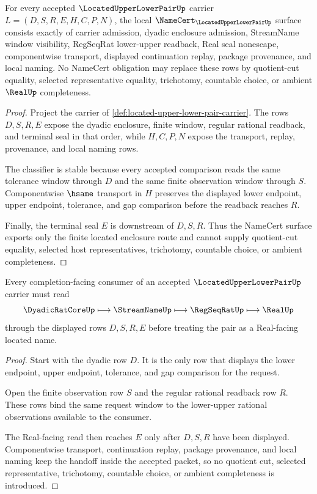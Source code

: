 \begin{theorem}
\label{thm:located-upper-lower-pair-namecert-obligations}
For every accepted $\LocatedUpperLowerPairUp$ carrier $L=(D,S,R,E,H,C,P,N)$, the local $\NameCert_{\LocatedUpperLowerPairUp}$ surface consists exactly of carrier admission, dyadic enclosure admission, StreamName window visibility, RegSeqRat lower-upper readback, Real seal nonescape, componentwise transport, displayed continuation replay, package provenance, and local naming. No NameCert obligation may replace these rows by quotient-cut equality, selected representative equality, trichotomy, countable choice, or ambient $\RealUp$ completeness.
\end{theorem}
\begin{proof}
Project the carrier of \autoref{def:located-upper-lower-pair-carrier}. The rows $D,S,R,E$ expose the dyadic enclosure, finite window, regular rational readback, and terminal seal in that order, while $H,C,P,N$ expose the transport, replay, provenance, and local naming rows.

The classifier is stable because every accepted comparison reads the same tolerance window through $D$ and the same finite observation window through $S$. Componentwise $\hsame$ transport in $H$ preserves the displayed lower endpoint, upper endpoint, tolerance, and gap comparison before the readback reaches $R$.

Finally, the terminal seal $E$ is downstream of $D,S,R$. Thus the NameCert surface exports only the finite located enclosure route and cannot supply quotient-cut equality, selected host representatives, trichotomy, countable choice, or ambient completeness.
\end{proof}

\begin{theorem}
\label{thm:located-upper-lower-pair-completion-handoff}
Every completion-facing consumer of an accepted $\LocatedUpperLowerPairUp$ carrier must read
$$
\DyadicRatCoreUp \longmapsto \StreamNameUp \longmapsto \RegSeqRatUp \longmapsto \RealUp
$$
through the displayed rows $D,S,R,E$ before treating the pair as a Real-facing located name.
\end{theorem}
\begin{proof}
Start with the dyadic row $D$. It is the only row that displays the lower endpoint, upper endpoint, tolerance, and gap comparison for the request.

Open the finite observation row $S$ and the regular rational readback row $R$. These rows bind the same request window to the lower-upper rational observations available to the consumer.

The Real-facing read then reaches $E$ only after $D,S,R$ have been displayed. Componentwise transport, continuation replay, package provenance, and local naming keep the handoff inside the accepted packet, so no quotient cut, selected representative, trichotomy, countable choice, or ambient completeness is introduced.
\end{proof}

